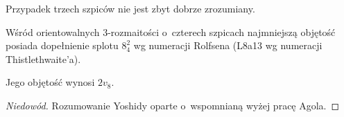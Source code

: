 Przypadek trzech szpiców nie jest zbyt dobrze zrozumiany.
%

\begin{proposition}
    Wśród orientowalnych 3-rozmaitości o~czterech szpicach najmniejszą objętość posiada dopełnienie splotu $8_4^2$ wg numeracji Rolfsena (L8a13 wg numeracji Thistlethwaite'a).
%
\end{proposition}

Jego objętość wynosi $2v_8$.

\begin{proof}[Niedowód]
%
    Rozumowanie Yoshidy \cite{yoshida13} oparte o~wspomnianą wyżej pracę Agola.
\end{proof}

%

